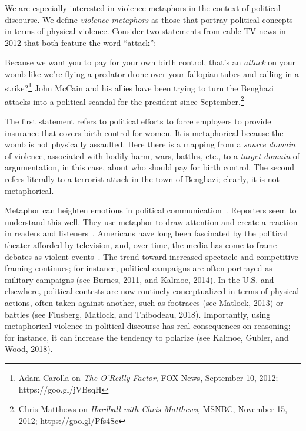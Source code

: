 We are especially interested in violence
metaphors in the context of political discourse. We define \emph{violence
metaphors} as those that portray political concepts in terms of physical
violence. Consider two statements from cable TV news in 2012 that both feature the
word ``attack'':
\begin{exe} \ex Because we want you to pay for your own birth control,
  that's an \emph{attack} on your womb like we're flying a predator drone over your
  fallopian tubes and calling in a strike?\footnote{\footnotesize Adam Carolla on \emph{The
  O'Reilly Factor}, FOX News, September 10, 2012; https://goo.gl/jVBsqH}
  \label{ex:carolla} 
  \ex John McCain and his allies have been trying to turn the
  Benghazi attacks into a political scandal for the president since
  September.\footnote{\footnotesize Chris Matthews on \emph{Hardball with Chris Matthews},
  MSNBC, November 15, 2012; https://goo.gl/Pfs4Sc}
\label{ex:benghazi-attacks} \end{exe} The first statement refers to political
efforts to force employers to provide insurance that covers birth control for
women.  It is metaphorical because the
womb is not physically assaulted. Here there is a mapping from a \emph{source domain} of  violence,
associated with bodily harm, wars, battles, etc., to  a \emph{target domain} of
argumentation, in this case, about who should pay for birth control. The second
refers literally to a terrorist attack in the town of Benghazi;
clearly, it is not metaphorical. 

Metaphor can heighten emotions in political
communication~\cite{Charteris-Black2009}. Reporters seem to understand this
well.  They use metaphor to draw attention and create a reaction in readers and
listeners~\cite{Lakoff2008}. Americans have long been fascinated by the
political theater afforded by television, and, over time, the media has come to
frame debates as violent events~\cite{Schroeder2008}. The trend toward increased
spectacle and competitive framing continues; 
for instance, political campaigns are often portrayed as
military campaigns (see Burnes, 2011, and Kalmoe, 2014). In the U.S. and
elsewhere, political contests are now routinely conceptualized in terms of
physical actions, often taken against another, such as footraces
(see Matlock, 2013) or battles (see Flusberg, Matlock, and Thibodeau, 2018). 
Importantly, using metaphorical violence in political discourse has 
real consequences on reasoning; for instance, it can increase the tendency to polarize
(see Kalmoe, Gubler, and Wood, 2018).

